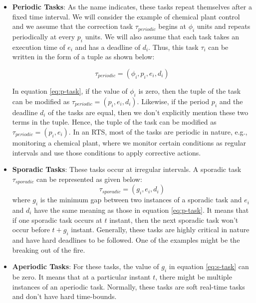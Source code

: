 \documentclass[12pt]{report}
\begin{document}
\begin{itemize}
\item \textbf{Periodic Tasks}: As the name indicates, these tasks repeat themselves after a fixed time interval. We will consider the example of chemical plant control and we assume that the correction task $\tau_{periodic}$ begins at $\phi_i$ units and repeats periodically at every $p_i$  units. We will also assume that each task takes an execution time of $e_i$ and has a deadline of $d_i$. Thus, this task $\tau_i$ can be written in the form of a tuple as shown below:

\begin{equation} \label{eq:p-task}
\tau_{periodic} = (\phi_i, p_i, e_i, d_i)
\end{equation}

In equation \ref{eq:p-task}, if the value of $\phi_i$ is zero, then the tuple of the task can be modified as $\tau_{periodic} = (p_i, e_i, d_i)$. Likewise, if the period $p_i$  and the deadline $d_i$ of the tasks are equal, then we don't explicitly mention these two terms in the tuple. Hence, the tuple of the task can be modified as $\tau_{periodic} = (p_i, e_i)$. In an RTS, most of the tasks are periodic in nature, e.g., monitoring a chemical plant, where we monitor certain conditions as regular intervals and use those conditions to apply corrective actions. 

\item \textbf{Sporadic Tasks}: These tasks occur at irregular intervals. A sporadic task $\tau_{sporadic}$ can be represented as given below:
\begin{equation} \label{eq:s-task}
\tau_{sporadic} = (g_i, e_i, d_i)
\end{equation}
where $g_i$ is the minimum gap between two instances of a sporadic task and $e_i$ and $d_i$ have the same meaning as those in equation \ref{eq:p-task}. It means that if one sporadic task occurs at $t$ instant, then the next sporadic task won't occur before $t+g_i$ instant. Generally, these tasks are highly critical in nature and have hard deadlines to be followed. One of the examples might be the breaking out of the fire. 

\item \textbf{Aperiodic Tasks}: For these tasks, the value of $g_i$ in equation \ref{eq:s-task} can be zero. It means that at a particular instant $t$, there might be multiple instances of an aperiodic task. Normally, these tasks are soft real-time tasks and don't have hard time-bounds. 
\end{itemize}
\end{document}
